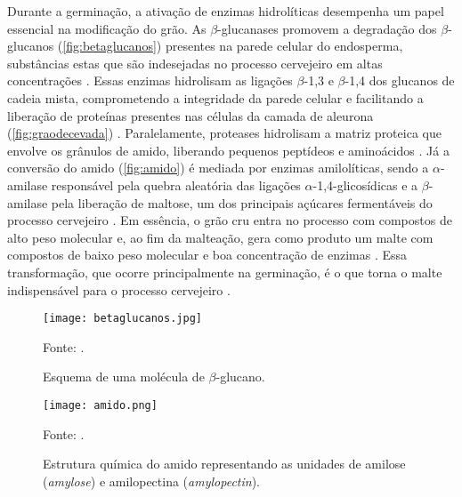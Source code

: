 Durante a germinação, a ativação de enzimas hidrolíticas desempenha um papel essencial na modificação do grão. As $\beta$-glucanases promovem a degradação dos $\beta$-glucanos (\autoref{fig:betaglucanos}) presentes na parede celular do endosperma, substâncias estas que são indesejadas no processo cervejeiro em altas concentrações \cite{LEWIS2012}. Essas enzimas hidrolisam as ligações $\beta$-1,3 e $\beta$-1,4 dos glucanos de cadeia mista, comprometendo a integridade da parede celular e facilitando a liberação de proteínas presentes nas células da camada de aleurona (\autoref{fig:graodecevada}) \cite{bobade2022betaglucans}. Paralelamente, proteases hidrolisam a matriz proteica que envolve os grânulos de amido, liberando pequenos peptídeos e aminoácidos \cite{FOX2009,GUPTA2010}. Já a conversão do amido (\autoref{fig:amido}) é mediada por enzimas amilolíticas, sendo a $\alpha$-amilase responsável pela quebra aleatória das ligações $\alpha$-1,4-glicosídicas e a $\beta$-amilase pela liberação de maltose, um dos principais açúcares fermentáveis do processo cervejeiro \cite{GUPTA2010,MALLETT2022}. Em essência, o grão cru entra no processo com compostos de alto peso molecular e, ao fim da malteação, gera como produto um malte com compostos de baixo peso molecular e boa concentração de enzimas \cite{KUNZE1996}. Essa transformação, que ocorre principalmente na germinação, é o que torna o malte indispensável para o processo cervejeiro \cite{CENCI2021}.

\begin{figure}[ht]
    \centering
    \caption{Esquema de uma molécula de $\beta$-glucano.}
    \label{fig:betaglucanos}
    \texttt{[image: betaglucanos.jpg]}

    {\centering\footnotesize Fonte: .\par}
\end{figure}

\begin{figure}[ht]
    \centering
    \caption{Estrutura química do amido representando as unidades de amilose (\textit{amylose}) e amilopectina (\textit{amylopectin}).}
    \label{fig:amido}
    \texttt{[image: amido.png]}

    {\centering\footnotesize Fonte: .\par}
\end{figure}

